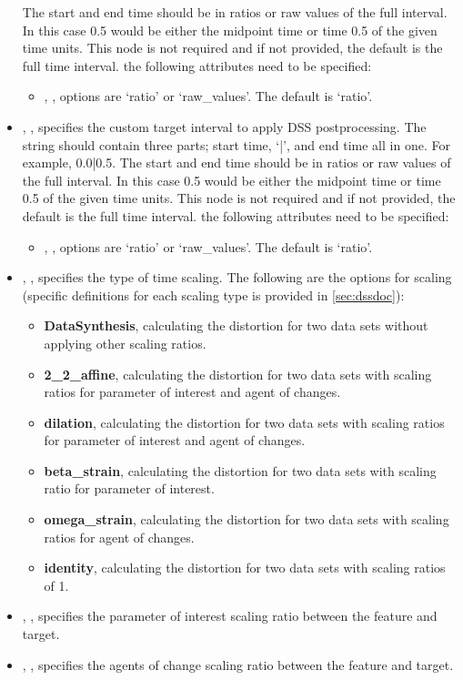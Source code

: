 \begin{itemize}
      The start and end time should be in ratios or raw values of the full interval. In this case 0.5 would be either the midpoint time or time 0.5 of the given time units. This node is not required and if not provided, the default is the full time interval.
      the following attributes need to be specified:
      \begin{itemize}
        \item {}, , options are `ratio' or `raw\_values'. The default is `ratio'.
      \end{itemize}
    \item {}, , specifies the custom target interval to apply DSS postprocessing. The string should contain three parts; start time, `|', and end time all in one. For example, 0.0|0.5.
      The start and end time should be in ratios or raw values of the full interval. In this case 0.5 would be either the midpoint time or time 0.5 of the given time units. This node is not required and if not provided, the default is the full time interval.
      the following attributes need to be specified:
      \begin{itemize}
        \item {}, , options are `ratio' or `raw\_values'. The default is `ratio'.
      \end{itemize}
    \item {}, , specifies the type of time scaling. The following are the options for scaling (specific definitions for each scaling type is provided in \ref{sec:dssdoc}):
      \begin{itemize}
        \item \textbf{DataSynthesis}, calculating the distortion for two data sets without applying other scaling ratios.
        \item \textbf{2\_2\_affine}, calculating the distortion for two data sets with scaling ratios for parameter of interest and agent of changes.
        \item \textbf{dilation}, calculating the distortion for two data sets with scaling ratios for parameter of interest and agent of changes.
        \item \textbf{beta\_strain}, calculating the distortion for two data sets with scaling ratio for parameter of interest.
        \item \textbf{omega\_strain}, calculating the distortion for two data sets with scaling ratios for agent of changes.
        \item \textbf{identity}, calculating the distortion for two data sets with scaling ratios of 1.
      \end{itemize}
    \item {}, , specifies the parameter of interest scaling ratio between the feature and target.
    \item {}, , specifies the agents of change scaling ratio between the feature and target.
\end{itemize}

